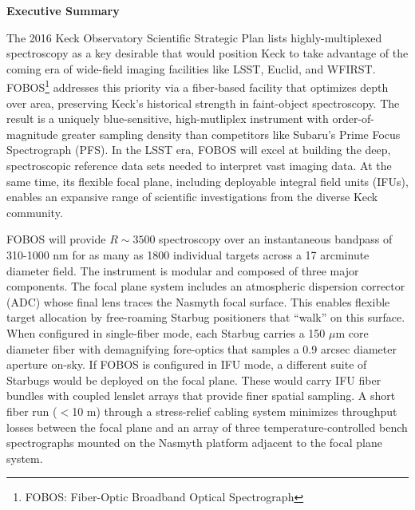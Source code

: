 
\centerline{{\large\bf Executive Summary}}


The 2016 Keck Observatory Scientific Strategic Plan lists highly-multiplexed spectroscopy as a key desirable that would
position Keck to take advantage of the coming era of wide-field imaging facilities like LSST, Euclid, and WFIRST.  FOBOS\footnote{FOBOS: Fiber-Optic Broadband Optical
Spectrograph} addresses this priority via a fiber-based facility that optimizes depth over area, preserving Keck's historical strength in faint-object spectroscopy.  The result is a uniquely blue-sensitive, high-mutliplex instrument with order-of-magnitude greater sampling density than competitors like Subaru's Prime Focus Spectrograph (PFS).  In the LSST era, FOBOS will excel at building the deep, spectroscopic reference data sets needed to interpret vast imaging data.  At the same time, its flexible focal plane, including deployable integral field units (IFUs), enables an expansive range of scientific investigations from the diverse Keck community.

FOBOS will provide $R \sim 3500$ spectroscopy over an instantaneous bandpass of 310-1000 nm for as many as 1800
individual targets across a 17 arcminute diameter field.  The instrument is modular and composed of three major
components.  The focal plane system includes an atmospheric dispersion corrector (ADC) whose final lens traces the
Nasmyth focal surface.  This enables flexible target allocation by free-roaming Starbug positioners that ``walk'' on
this surface.  When configured in single-fiber mode, each Starbug carries a 150 $\mu$m core diameter fiber with
demagnifying fore-optics that samples a 0.9 arcsec diameter aperture on-sky.  If FOBOS is configured in IFU mode, a
different suite of Starbugs would be deployed on the focal plane.  These would carry IFU fiber bundles with coupled
lenslet arrays that provide finer spatial sampling.  A short fiber run ($<$10 m) through a stress-relief cabling system
minimizes throughput losses between the focal plane and an array of three temperature-controlled bench spectrographs
mounted on the Nasmyth platform adjacent to the focal plane system.

